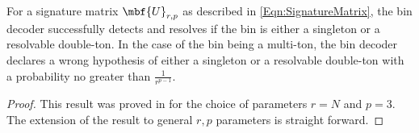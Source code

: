 \documentclass[conference,twocolumn]{IEEEtran}
\def\proofgap{-3ex}
\begin{document}
{\begin{lemma}
\label{Lem:BinDecoderAnalysis}
For a signature matrix $\mbf{U}_{r,p}$ as described in \eqref{Eqn:SignatureMatrix}, the bin decoder successfully detects and resolves if the bin is either a singleton or a resolvable double-ton. In the case of the bin being a multi-ton, the bin decoder declares a wrong hypothesis of either a singleton or a resolvable double-ton with a probability no greater than $\frac{1}{r^{p-1}}$.
\end{lemma}
\vspace{\proofgap}
\begin{proof}
This result was proved in \cite{lee2015saffron} for the choice of parameters $r=N$ and $p=3$. The extension of the result to general $r,p$ parameters is straight forward.
\end{proof}

}
\end{document}
